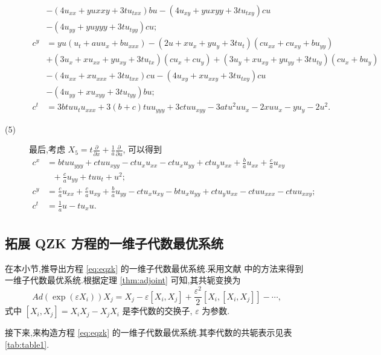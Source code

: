 \begin{description}
\begin{equation*}
\begin{aligned}
&-(4u_{xx}+yu{xxy}+3tu_{txx})bu-(4u_{xy}+yu{xyy}+3tu_{txy})cu\\
&-(4u_{yy}+yu{yyy}+3tu_{tyy})cu;\\
c^{y}&=yu(u_{t}+auu_{x}+bu_{xxx})-(2u+xu_{x}+yu_{y}+3tu_{t})(cu_{xx}+cu_{xy}+bu_{yy})\\
&+(3u_{x}+xu_{xx}+yu_{xy}+3tu_{tx})(cu_{x}+cu_{y})+(3u_{y}+xu_{xy}+yu_{yy}+3tu_{ty})(cu_{x}+bu_{y})\\
&-(4u_{xx}+xu_{xxx}+3tu_{txx})cu-(4u_{xy}+xu_{xxy}+3tu_{txy})cu\\
&-(4u_{yy}+xu_{xyy}+3tu_{tyy})bu;\\
c^{t}&=3btuu_{t}u_{xxx}+3(b+c)tuu_{yyy}+3ctuu_{xyy}-3atu^2uu_x-2xuu_x-yu_y-2u^2.
\end{aligned}
\end{equation*}

\item[(5)] 最后,考虑 $X_{5}=t\frac{\partial}{\partial x}+\frac{1}{a}\frac{\partial}{\partial u}$, 可以得到
\begin{equation*}
\begin{aligned}
c^{x}&=btuu_{yyy}+ctuu_{xyy}-ctu_{x}u_{xx}-ctu_{x}u_{yy}+ctu_{y}u_{xx}+\frac{b}{a}u_{xx}+\frac{c}{a}u_{xy}\\
&~~~+\frac{c}{a}u_{yy}+tuu_t+u^2;\\
c^{y}&=\frac{c}{a}u_{xx}+\frac{c}{a}u_{xy}+\frac{b}{a}u_{yy}-ctu_{x}u_{xy}-btu_{x}u_{yy}+ctu_{y}u_{xx}-ctuu_{xxx}-ctuu_{xxy};\\
c^{t}&=\frac{1}{a}u-tu_{x}u.\\
\end{aligned}
\end{equation*}
\end{description}

\subsection{拓展 QZK 方程的一维子代数最优系统}\label{sec:05optimal}
在本小节,推导出方程 \eqref{eq:eqzk} 的一维子代数最优系统.采用文献 \cite{peter2000sym} 中的方法来得到一维子代数最优系统.根据定理 \ref{thm:adjoint} 可知,其共轭变换为
\begin{equation*}
	Ad(\exp(\varepsilon X_i))X_j=X_j-\varepsilon[X_i,X_j]+\frac{\varepsilon^2}{2}[X_i,[X_i,X_j]]-\cdots,
\end{equation*}
式中 $[X_i,X_j]=X_iX_j-X_jX_i$ 是李代数的交换子, $\varepsilon$ 为参数.

接下来,来构造方程 \eqref{eq:eqzk} 的一维子代数最优系统.其李代数的共轭表示见表 \ref{tab:table1}.


